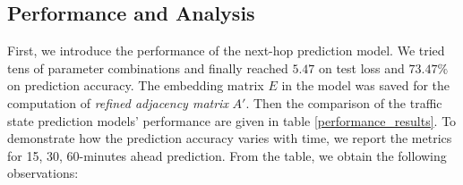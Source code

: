\subsection{Performance and Analysis}
First, we introduce the performance of the next-hop prediction model. We tried tens of parameter combinations and finally reached $5.47$ on test loss and $73.47\%$ on prediction accuracy. The embedding matrix $E$ in the model was saved for the computation of \textit{refined adjacency matrix} $A'$. Then the comparison of the traffic state prediction models' performance are given in table \ref{performance_results}. To demonstrate how the prediction accuracy varies with time, we report the metrics for 15, 30, 60-minutes ahead prediction. From the table, we obtain the following observations:

\begin{table}[htb]
    \renewcommand\arraystretch{1.5} %
    \begin{center}
        \caption{Performance evaluation results.}
        \label{performance_results}
\end{center}
\end{table}
